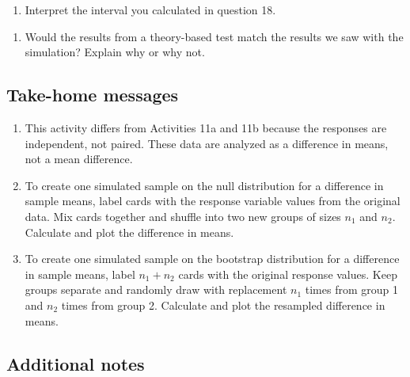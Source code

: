 \documentclass[
]{report}
\providecommand{\tightlist}{%
  \setlength{\itemsep}{0pt}\setlength{\parskip}{0pt}}
\begin{document}
\vspace{0.3in}

\begin{enumerate}
\def\labelenumi{\arabic{enumi}.}
\setcounter{enumi}{18}
\tightlist
\item
  Interpret the interval you calculated in question 18.
\end{enumerate}

\vspace{1in}

\begin{enumerate}
\def\labelenumi{\arabic{enumi}.}
\setcounter{enumi}{19}
\tightlist
\item
  Would the results from a theory-based test match the results we saw with the simulation? Explain why or why not.
\end{enumerate}

\vspace{1in}

\newpage

\hypertarget{take-home-messages-17}{%
\subsection{Take-home messages}\label{take-home-messages-17}}

\begin{enumerate}
\def\labelenumi{\arabic{enumi}.}
\item
  This activity differs from Activities 11a and 11b because the responses are independent, not paired. These data are analyzed as a difference in means, not a mean difference.
\item
  To create one simulated sample on the null distribution for a difference in sample means, label cards with the response variable values from the original data. Mix cards together and shuffle into two new groups of sizes \(n_1\) and \(n_2\). Calculate and plot the difference in means.
\item
  To create one simulated sample on the bootstrap distribution for a difference in sample means, label \(n_1 + n_2\) cards with the original response values. Keep groups separate and randomly draw with replacement \(n_1\) times from group 1 and \(n_2\) times from group 2. Calculate and plot the resampled difference in means.
\end{enumerate}

\hypertarget{additional-notes-17}{%
\subsection{Additional notes}\label{additional-notes-17}}
\end{document}

